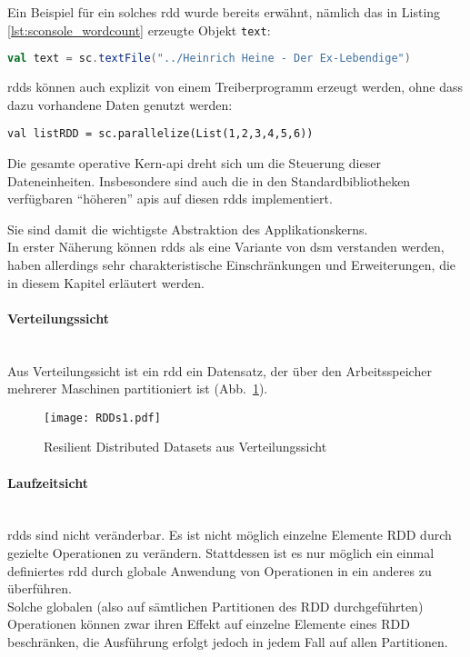Ein Beispiel für ein solches \gls{rdd} wurde bereits erwähnt, nämlich das in Listing \ref{lst:sconsole_wordcount} erzeugte Objekt \lstinline|text|:\\

\begin{lstlisting}[language=Scala]
val text = sc.textFile("../Heinrich Heine - Der Ex-Lebendige")
\end{lstlisting}

\Glspl{rdd} können auch explizit von einem Treiberprogramm erzeugt werden, ohne dass dazu vorhandene Daten genutzt werden:\\

\begin{lstlisting}
val listRDD = sc.parallelize(List(1,2,3,4,5,6))
\end{lstlisting}

Die gesamte operative Kern-\gls{api} dreht sich um die Steuerung dieser Dateneinheiten. Insbesondere sind auch die in den Standardbibliotheken verfügbaren "`höheren"' \glspl{api} auf diesen \glspl{rdd} implementiert.

Sie sind damit die wichtigste Abstraktion des Applikationskerns.\\

In erster Näherung können \glspl{rdd} als eine Variante von \gls{dsm}\cite{Nitzberg:1991:DSM:112827.112855} \cite{Mat12} verstanden werden, haben allerdings sehr charakteristische Einschränkungen und Erweiterungen, die in diesem Kapitel erläutert werden.\\

\paragraph{Verteilungssicht}
\\
Aus Verteilungssicht ist ein \gls{rdd} ein Datensatz, der über den Arbeitsspeicher mehrerer Maschinen partitioniert ist (Abb.~\ref{fig:rdds1}).

\begin{figure}[ht!]
	\centering
  \texttt{[image: RDDs1.pdf]}
	\caption{Resilient Distributed Datasets aus Verteilungssicht}
	\label{fig:rdds1}
\end{figure}

\paragraph{Laufzeitsicht}
\\
\Glspl{rdd} sind nicht veränderbar. Es ist nicht möglich einzelne Elemente \gls{RDD} durch gezielte Operationen zu verändern. Stattdessen ist es nur möglich ein einmal definiertes \gls{rdd} durch globale Anwendung von Operationen in ein anderes zu überführen.\\
Solche globalen (also auf sämtlichen Partitionen des \gls{RDD} durchgeführten) Operationen können zwar ihren Effekt auf einzelne Elemente eines \gls{RDD} beschränken, die Ausführung erfolgt jedoch in jedem Fall auf allen Partitionen.\\

